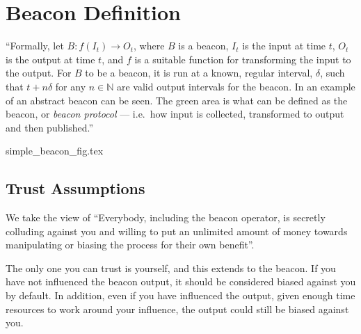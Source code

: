 \section{Beacon Definition}


\enquote{Formally, let $B: f(I_t) \rightarrow O_t$, where $B$ is a beacon, $I_t$ is the input at time $t$, $O_t$ is the output at time $t$, and $f$ is a suitable function for transforming the input to the output.
For $B$ to be a beacon, it is run at a known, regular interval, $\delta$, such that $t+n\delta$ for any $n \in \mathbb{N}$ are valid output intervals for the beacon.
In  an example of an abstract beacon can be seen.
The green area is what can be defined as the beacon, or \emph{beacon protocol} --- i.e.\ how input is collected, transformed to output and then published.}

{simple_beacon_fig.tex}


\subsection{Trust Assumptions}

We take the view of \enquote{Everybody, including the beacon operator, is secretly colluding against you and willing to put an unlimited amount of money towards manipulating or biasing the process for their own benefit}.

The only one you can trust is yourself, and this extends to the beacon. If you have not influenced the beacon output, it should be considered biased against you by default. In addition, even if you have influenced the output, given enough time resources to work around your influence, the output could still be biased against you. 
